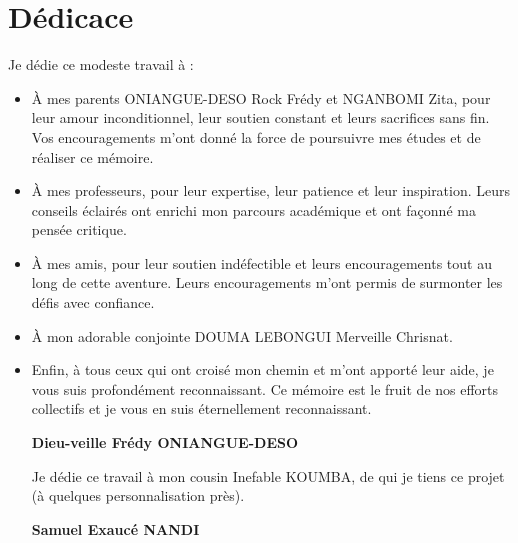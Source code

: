 \chapter*{Dédicace}
Je dédie ce modeste travail à :

\begin{itemize}
  \item {
      À mes parents ONIANGUE-DESO Rock Frédy et NGANBOMI Zita, pour leur amour
      inconditionnel, leur soutien constant et leurs sacrifices sans fin. Vos
      encouragements m’ont donné la force de poursuivre mes études et de réaliser ce mémoire.
    }
  \item {
      À mes professeurs, pour leur expertise, leur patience et leur inspiration.
      Leurs conseils éclairés ont enrichi mon parcours académique et ont façonné ma pensée critique.

    }
  \item {
      À mes amis, pour leur soutien indéfectible et leurs encouragements tout au
      long de cette aventure. Leurs encouragements m’ont permis de surmonter les défis avec confiance.

    }

  \item {
      À mon adorable conjointe DOUMA LEBONGUI Merveille Chrisnat.

    }

  \item {
      Enfin, à tous ceux qui ont croisé mon chemin et m’ont apporté leur aide, je vous suis profondément reconnaissant. Ce mémoire est le fruit de nos efforts collectifs et je vous en suis éternellement reconnaissant.
    }

    \vspace{0.2cm}
    \begin{flushright}
      \large {
        \textbf {
          Dieu-veille Frédy ONIANGUE-DESO
        }
      }
    \end{flushright}


    \newpage

    \vspace{2cm}
    Je dédie ce travail à mon cousin  Inefable KOUMBA, de qui je tiens ce 	projet (à quelques personnalisation près).
    \vspace{0.2cm}
    \begin{flushright}
      \large {
        \textbf {
          Samuel Exaucé NANDI
        }
      }
    \end{flushright}

\end{itemize}
